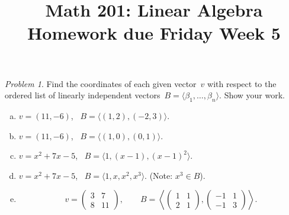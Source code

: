 \documentclass[11pt,twoside]{amsart}
\title{Math 201: Linear Algebra\\ Homework due Friday Week 5}
\theoremstyle{plain}
\theoremstyle{remark}
\newtheorem{prob}{Problem}
\theoremstyle{definition}
\theoremstyle{definition}
\begin{document}
\maketitle


\begin{prob}
Find the coordinates of each given vector~$v$ with respect to the
    ordered list of linearly independent vectors~$B=\langle
      \beta_1,\dots,\beta_n \rangle$.  Show
      your work.
    \begin{enumerate}[(a)]
      \item $v=(11,-6)$, \ $B=\langle (1,2),(-2,3)\rangle$.
      \item $v=(11,-6)$, \  $B=\langle (1,0),(0,1)\rangle$.
      \item $v=x^2+7x-5$, \ $B=\langle 1, (x-1), (x-1)^2\rangle$.
      \item $v=x^2+7x-5$, \ $B=\langle 1, x, x^2, x^3 \rangle$. (Note:
    $x^3\in B$).
      \item
  \[
    v =\left(\begin{array}{cc}
        3&7\\
        8&11
    \end{array} \right),\qquad
    B = \left\langle
    \left(\begin{array}{cc}
        1&1\\
        2&1
    \end{array} \right),
    \left(\begin{array}{rr}
        -1&1\\
        -1&3
    \end{array} \right)
    \right\rangle.
  \]
    \end{enumerate}
\end{prob}

\end{document}
